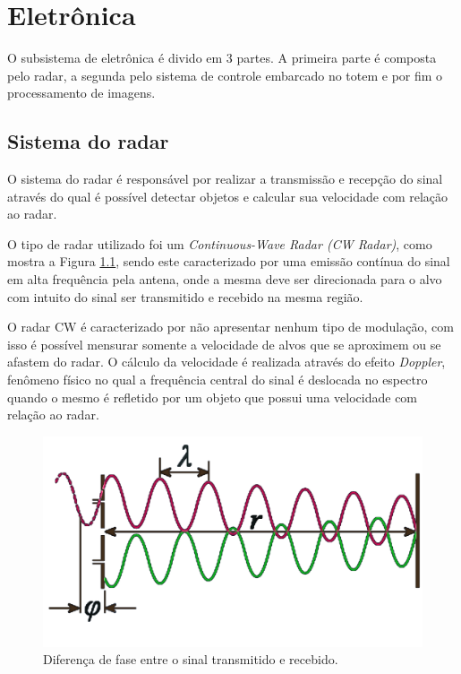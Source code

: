 \chapter{Eletrônica}

O subsistema de eletrônica é divido em 3 partes. A primeira parte é composta pelo radar, a segunda pelo sistema de controle embarcado no totem e por fim o processamento de imagens. 


\section{Sistema do radar}
O sistema do radar é responsável por realizar a transmissão e recepção do sinal através do qual é possível detectar objetos e calcular sua velocidade com relação ao radar.

O tipo de radar utilizado foi um \emph{Continuous-Wave Radar (CW Radar)}, como mostra a Figura \ref{Doppler1}, sendo este caracterizado por uma emissão contínua do sinal em alta frequência pela antena, onde a mesma deve ser direcionada para o alvo com intuito do sinal ser transmitido e recebido na mesma região. 

O radar CW \cite{CW} é caracterizado por não apresentar nenhum tipo de modulação, com isso é possível mensurar somente a velocidade de alvos que se aproximem ou se afastem do radar. O cálculo da velocidade é realizada através do efeito  \emph{Doppler}, fenômeno físico no qual a frequência central do sinal é deslocada no espectro quando o mesmo é refletido por um objeto que possui uma velocidade com relação ao radar. 
\begin{figure}[H]
    \centering
   \includegraphics[scale = 0.25]{figuras/Doppler2.pdf}
   \caption{Diferença de fase entre o sinal transmitido e recebido.}
   \label{Doppler1}
    \end{figure}

